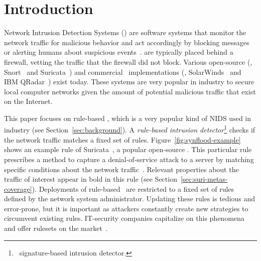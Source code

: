 \documentclass[sigconf,review, anonymous]{acmart}
\begin{document}


\maketitle

\section{Introduction}
\label{sec:intro}

Network Intrusion Detection Systems (\nids{}) are software systems
that monitor the network traffic for malicious behavior and act
accordingly by blocking messages or alerting humans about suspicious
events~\cite{Mitchell:2014:SID:2597757.2542049}. \nids{} are typically
placed behind a firewall, vetting the traffic that the firewall did
not block. Various open-source (\eg{}, Snort~\cite{snort} and
Suricata~\cite{suricata}) and commercial \nids\ implementations (\eg{},
SolarWinds~\cite{solarwinds} and IBM QRadar~\cite{qradar}) exist
today. These systems are very popular in industry to secure local
computer networks given the amount of potential malicious traffic that
exist on the Internet.

This paper focuses on rule-based \nids{}, which is a very popular kind
of NIDS used in industry (see Section~\ref{sec:background}). A
\emph{rule-based intrusion detector}\footnote{\aka\ signature-based
  intrusion detector.} checks if the network traffic matches a fixed
set of rules. Figure~\ref{fig:synflood-example} shows an example rule
of Suricata~\cite{suricata}, a popular open-source \nids{}. This
particular rule prescribes a method to capture a denial-of-service
attack to a server by matching specific conditions about the network
traffic~\cite{understanding-dos}. Relevant properties about the
traffic of interest appear in bold in this rule (see
Section~\ref{sec:suri-metas-coverage}). Deployments of rule-based
\nids\ are restricted to a fixed set of rules defined by the network
system administrator. Updating these rules is tedious and error-prone,
but it is important as attackers constantly create new strategies to
circumvent existing rules. IT-security companies capitalize on this
phenomena and offer rulesets on the
market~\cite{proofpoint-etpro,snort-rule-subscriptions}.
\end{document}
